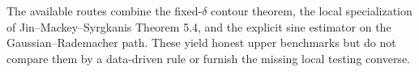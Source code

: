 The available routes combine the fixed-\(\delta\) contour theorem, the local specialization of Jin--Mackey--Syrgkanis Theorem 5.4, and the explicit sine estimator on the Gaussian--Rademacher path.  These yield honest upper benchmarks but do not compare them by a data-driven rule or furnish the missing local testing converse.